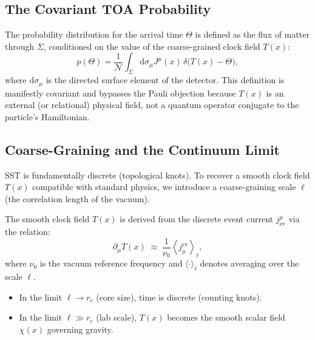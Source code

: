 \documentclass[10pt]{article}
\begin{document}
    \subsection{The Covariant TOA Probability}
        The probability distribution for the arrival time $\Theta$ is defined as the
        flux of matter through $\Sigma$, conditioned on the value of the coarse-grained
        clock field $T(x)$:
        \begin{equation}
            p(\Theta) = \frac{1}{\mathcal{N}} \int_\Sigma \mathrm{d}\sigma_\mu J^\mu(x) \, \delta\Big( T(x) - \Theta \Big),
        \end{equation}
        where $\mathrm{d}\sigma_\mu$ is the directed surface element of the detector.
        This definition is manifestly covariant and bypasses the Pauli objection because $T(x)$ is an external (or relational) physical field, not a quantum operator conjugate to the particle's Hamiltonian.

    \subsection{Coarse-Graining and the Continuum Limit}
        SST is fundamentally discrete (topological knots). To recover a smooth clock field $T(x)$
        compatible with standard physics, we introduce a coarse-graining scale $\ell$ (the correlation length of the vacuum).

        The smooth clock field $T(x)$ is derived from the discrete event current $j_{\mathrm{ev}}^\mu$ via the relation:
        \begin{equation}
            \partial_\mu T(x) \;\approx\; \frac{1}{\nu_0} \left\langle j_\mu^{\mathrm{ev}} \right\rangle_\ell,
        \end{equation}
        where $\nu_0$ is the vacuum reference frequency and $\langle \cdot \rangle_\ell$ denotes averaging over the scale $\ell$.
        \begin{itemize}
            \item In the limit $\ell \to r_c$ (core size), time is discrete (counting knots).
            \item In the limit $\ell \gg r_c$ (lab scale), $T(x)$ becomes the smooth scalar field $\chi(x)$ governing gravity.
        \end{itemize}
\end{document}
